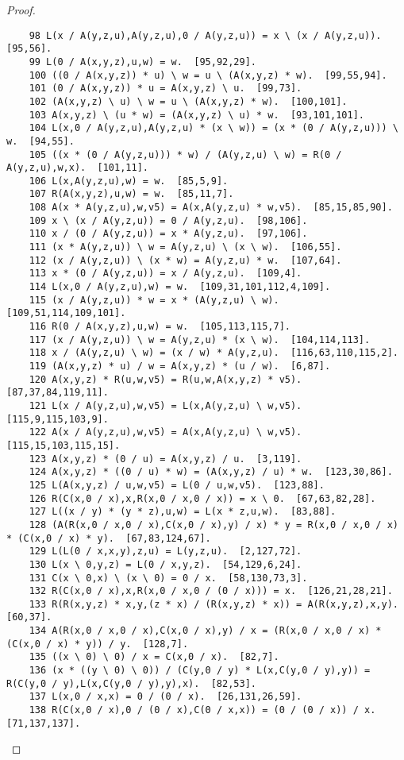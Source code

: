 \documentclass[12pt]{report}
\theoremstyle{definition}
\begin{document}
\begin{proof}
\begin{lstlisting}
    98 L(x / A(y,z,u),A(y,z,u),0 / A(y,z,u)) = x \ (x / A(y,z,u)).  [95,56].
    99 L(0 / A(x,y,z),u,w) = w.  [95,92,29].
    100 ((0 / A(x,y,z)) * u) \ w = u \ (A(x,y,z) * w).  [99,55,94].
    101 (0 / A(x,y,z)) * u = A(x,y,z) \ u.  [99,73].
    102 (A(x,y,z) \ u) \ w = u \ (A(x,y,z) * w).  [100,101].
    103 A(x,y,z) \ (u * w) = (A(x,y,z) \ u) * w.  [93,101,101].
    104 L(x,0 / A(y,z,u),A(y,z,u) * (x \ w)) = (x * (0 / A(y,z,u))) \ w.  [94,55].
    105 ((x * (0 / A(y,z,u))) * w) / (A(y,z,u) \ w) = R(0 / A(y,z,u),w,x).  [101,11].
    106 L(x,A(y,z,u),w) = w.  [85,5,9].
    107 R(A(x,y,z),u,w) = w.  [85,11,7].
    108 A(x * A(y,z,u),w,v5) = A(x,A(y,z,u) * w,v5).  [85,15,85,90].
    109 x \ (x / A(y,z,u)) = 0 / A(y,z,u).  [98,106].
    110 x / (0 / A(y,z,u)) = x * A(y,z,u).  [97,106].
    111 (x * A(y,z,u)) \ w = A(y,z,u) \ (x \ w).  [106,55].
    112 (x / A(y,z,u)) \ (x * w) = A(y,z,u) * w.  [107,64].
    113 x * (0 / A(y,z,u)) = x / A(y,z,u).  [109,4].
    114 L(x,0 / A(y,z,u),w) = w.  [109,31,101,112,4,109].
    115 (x / A(y,z,u)) * w = x * (A(y,z,u) \ w).  [109,51,114,109,101].
    116 R(0 / A(x,y,z),u,w) = w.  [105,113,115,7].
    117 (x / A(y,z,u)) \ w = A(y,z,u) * (x \ w).  [104,114,113].
    118 x / (A(y,z,u) \ w) = (x / w) * A(y,z,u).  [116,63,110,115,2].
    119 (A(x,y,z) * u) / w = A(x,y,z) * (u / w).  [6,87].
    120 A(x,y,z) * R(u,w,v5) = R(u,w,A(x,y,z) * v5).  [87,37,84,119,11].
    121 L(x / A(y,z,u),w,v5) = L(x,A(y,z,u) \ w,v5).  [115,9,115,103,9].
    122 A(x / A(y,z,u),w,v5) = A(x,A(y,z,u) \ w,v5).  [115,15,103,115,15].
    123 A(x,y,z) * (0 / u) = A(x,y,z) / u.  [3,119].
    124 A(x,y,z) * ((0 / u) * w) = (A(x,y,z) / u) * w.  [123,30,86].
    125 L(A(x,y,z) / u,w,v5) = L(0 / u,w,v5).  [123,88].
    126 R(C(x,0 / x),x,R(x,0 / x,0 / x)) = x \ 0.  [67,63,82,28].
    127 L((x / y) * (y * z),u,w) = L(x * z,u,w).  [83,88].
    128 (A(R(x,0 / x,0 / x),C(x,0 / x),y) / x) * y = R(x,0 / x,0 / x) * (C(x,0 / x) * y).  [67,83,124,67].
    129 L(L(0 / x,x,y),z,u) = L(y,z,u).  [2,127,72].
    130 L(x \ 0,y,z) = L(0 / x,y,z).  [54,129,6,24].
    131 C(x \ 0,x) \ (x \ 0) = 0 / x.  [58,130,73,3].
    132 R(C(x,0 / x),x,R(x,0 / x,0 / (0 / x))) = x.  [126,21,28,21].
    133 R(R(x,y,z) * x,y,(z * x) / (R(x,y,z) * x)) = A(R(x,y,z),x,y).  [60,37].
    134 A(R(x,0 / x,0 / x),C(x,0 / x),y) / x = (R(x,0 / x,0 / x) * (C(x,0 / x) * y)) / y.  [128,7].
    135 ((x \ 0) \ 0) / x = C(x,0 / x).  [82,7].
    136 (x * ((y \ 0) \ 0)) / (C(y,0 / y) * L(x,C(y,0 / y),y)) = R(C(y,0 / y),L(x,C(y,0 / y),y),x).  [82,53].
    137 L(x,0 / x,x) = 0 / (0 / x).  [26,131,26,59].
    138 R(C(x,0 / x),0 / (0 / x),C(0 / x,x)) = (0 / (0 / x)) / x.  [71,137,137].

\end{lstlisting}
\end{proof}
\end{document}
